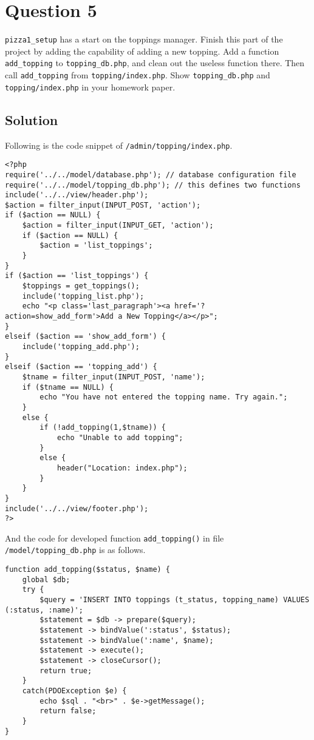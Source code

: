 
\section*{Question 5}

\texttt{pizza1\_setup} has a start on the toppings manager.
Finish this part of the project by adding the capability of adding a new topping.
Add a function \texttt{add\_topping} to \texttt{topping\_db.php}, and clean out the useless function there.
Then call \texttt{add\_topping} from \texttt{topping/index.php}.
Show \texttt{topping\_db.php} and \texttt{topping/index.php} in your homework paper.

\subsection*{Solution}

\lstset{language=PHP}
Following is the code snippet of \texttt{/admin/topping/index.php}.
\begin{lstlisting}
<?php
require('../../model/database.php'); // database configuration file
require('../../model/topping_db.php'); // this defines two functions
include('../../view/header.php');
$action = filter_input(INPUT_POST, 'action');
if ($action == NULL) {
	$action = filter_input(INPUT_GET, 'action');
	if ($action == NULL) {
		$action = 'list_toppings';
	}
}
if ($action == 'list_toppings') {
	$toppings = get_toppings();
	include('topping_list.php');
	echo "<p class='last_paragraph'><a href='?action=show_add_form'>Add a New Topping</a></p>";
}
elseif ($action == 'show_add_form') {
	include('topping_add.php');
}
elseif ($action == 'topping_add') {
	$tname = filter_input(INPUT_POST, 'name');
	if ($tname == NULL) {
		echo "You have not entered the topping name. Try again.";
	}
	else {
		if (!add_topping(1,$tname)) {
			echo "Unable to add topping";
		}
		else {
			header("Location: index.php");
		}
	}
}
include('../../view/footer.php');
?>
\end{lstlisting}
And the code for developed function \texttt{add\_topping()} in file \texttt{/model/topping\_db.php} is as follows.
\begin{lstlisting}
function add_topping($status, $name) {
	global $db;
	try {
		$query = 'INSERT INTO toppings (t_status, topping_name) VALUES (:status, :name)';
		$statement = $db -> prepare($query);
		$statement -> bindValue(':status', $status);
		$statement -> bindValue(':name', $name);
		$statement -> execute();
		$statement -> closeCursor();
		return true;
	}
	catch(PDOException $e) {
		echo $sql . "<br>" . $e->getMessage();
		return false;
	}
}
\end{lstlisting}

